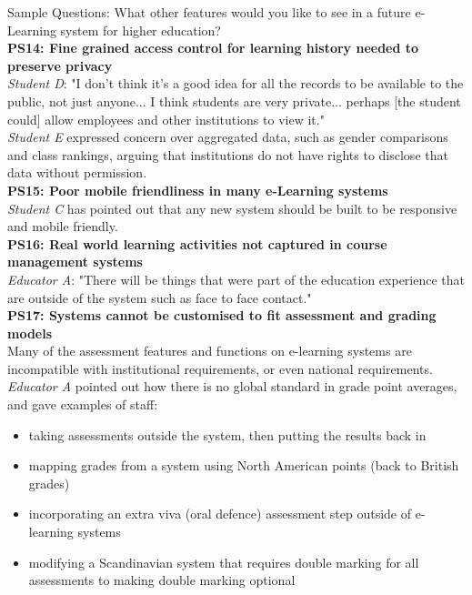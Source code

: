 Sample Questions: What other features would you like to see in a future e-Learning system for 
higher education?
\vspace{0.25cm}\\
\textbf{PS14: Fine grained access control for learning history needed to preserve privacy}\\
\textit{Student D}: "I don't think it's a good idea for all the records to be available to the public, 
not just anyone... I think students are very private... perhaps [the student could] allow employees and 
other institutions to view it."\\
\textit{Student E} expressed concern over aggregated data, such as gender comparisons and class rankings, 
arguing that institutions do not have rights to disclose that data without permission.
\vspace{0.25cm}\\
\textbf{PS15: Poor mobile friendliness in many e-Learning systems}\\
\textit{Student C} has pointed out that any new system should be built to be responsive and mobile friendly.
\vspace{0.25cm}\\
\textbf{PS16: Real world learning activities not captured in course management systems}\\
\textit{Educator A}: "There will be things that were part of the education experience that are outside of the system
such as face to face contact."
\vspace{0.25cm}\\
\textbf{PS17: Systems cannot be customised to fit assessment and grading models}\\
Many of the assessment features and functions on e-learning systems are incompatible 
with institutional requirements, or even national requirements. \textit{Educator A} pointed out how there is 
no global standard in grade point averages, and gave examples of staff:
\begin{itemize}
    \setlength\itemsep{0em}
    \item taking assessments outside the system, then putting the results back in
    \item mapping grades from a system using North American points (back to British grades)
    \item incorporating an extra viva (oral defence) assessment step outside of e-learning systems
    \item modifying a Scandinavian system that requires double marking for all assessments 
    to making double marking optional
\end{itemize}
